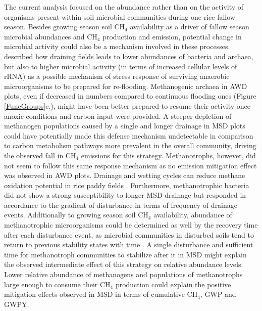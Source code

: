 The current analysis focused on the abundance rather than on the activity of organisms present within soil microbial communities during one rice fallow season. 
Besides growing season soil CH$_{4}$ availability as a driver of fallow season microbial abundances and CH$_{4}$ production and emission, potential change in microbial activity could also be a mechanism involved in these processes.
\cite{breidenbach2014} described how draining fields leads to lower abundances of bacteria and archaea, but also to higher microbial activity (in terms of increased cellular levels of rRNA) as a possible mechanism of stress response of surviving anaerobic microorganisms to be prepared for re-flooding. Methanogenic archaea in AWD plots, even if decreased in numbers compared to continuous flooding ones (Figure \ref{FuncGroups}c.), might have been better prepared to resume their activity once anoxic conditions and carbon input were provided. A steeper depletion of methanogen populations caused by a single and longer drainage in MSD plots could have potentially made this defense mechanism undetectable in comparison to carbon metabolism pathways more prevalent in the overall community, driving the observed fall in CH$_{4}$ emissions for this strategy. Methanotrophs, however, did not seem to follow this same response mechanism as no emission mitigation effect was observed in AWD plots. Drainage and wetting cycles can reduce methane oxidation potential in rice paddy fields \citep{ma2013}. Furthermore, methanotrophic bacteria did not show a strong susceptibility to longer MSD drainage but responded in accordance to the gradient of disturbance in terms of frequency of drainage events. Additionally to growing season soil CH$_{4}$ availability, abundance of methanotrophic microorganisms could be determined as well by the recovery time after each disturbance event, as microbial communities in disturbed soils tend to return to previous stability states with time \citep{jangid2011}. A single disturbance and sufficient time for methanotroph communities to stabilize after it in MSD might explain the observed intermediate effect of this strategy on relative abundance levels. Lower relative abundance of methanogens and populations of methanotrophs large enough to consume their CH$_{4}$ production could explain the positive mitigation effects observed in MSD in terms of cumulative CH$_{4}$, GWP and GWPY. \\

